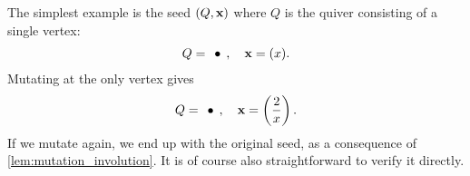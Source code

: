 \begin{example}
	The simplest example is the seed $(Q, \mathbf{x})$ where $Q$ is the quiver consisting of a single vertex:
	\begin{equation*}
		Q = \begin{tikzcd}
			\bullet
		\end{tikzcd},
		\quad \bx = (x).
	\end{equation*}
	Mutating at the only vertex gives
	\begin{equation*}
		Q = \begin{tikzcd}
			\bullet
		\end{tikzcd},
		\quad \bx = \left(\frac{2}{x}\right).
	\end{equation*}
	If we mutate again, we end up with the original seed, as a consequence of
	\cref{lem:mutation_involution}. It is of course also straightforward to verify it
	directly.
\end{example}
